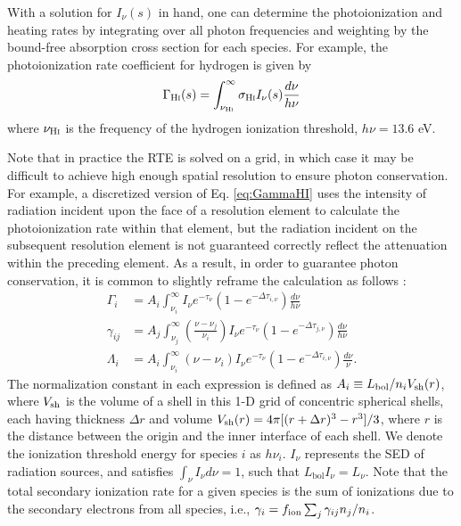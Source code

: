 With a solution for $I_{\nu}(s)$ in hand, one can determine the photoionization and heating rates by integrating over all photon frequencies and weighting by the bound-free absorption cross section for each species. For example, the photoionization rate coefficient for hydrogen is given by
\begin{equation}
	\Gamma_{\text{H} {\textsc{i}}}(s) = \int_{\nu_{\text{H} {\textsc{i}}}}^{\infty} \sigma_{\text{H} {\textsc{i}}} I_{\nu}(s) \frac{d\nu}{h\nu} \label{eq:GammaHI}
\end{equation}
where $\nu_{\text{H} {\textsc{i}}}$ is the frequency of the hydrogen ionization threshold, $h\nu=13.6$ eV.

Note that in practice the RTE is solved on a grid, in which case it may be difficult to achieve high enough spatial resolution to ensure photon conservation. For example, a discretized version of Eq. \ref{eq:GammaHI} uses the intensity of radiation incident upon the face of a resolution element to calculate the photoionization rate within that element, but the radiation incident on the subsequent resolution element is not guaranteed correctly reflect the attenuation within the preceding element. As a result, in order to guarantee photon conservation, it is common to slightly reframe the calculation as follows \cite{Abel1999}:
\begin{align}
    \Gamma_i & = A_i \int_{\nu_i}^{\infty} I_{\nu} e^{-\tau_{\nu}} \left(1 - e^{-\Delta \tau_{i,\nu}}\right) \frac{d\nu}{h\nu} \label{eq:PhotoIonizationRate} \\
    \gamma_{ij} & = A_j \int_{\nu_j}^{\infty} \left(\frac{\nu - \nu_j}{\nu_i}\right) I_{\nu} e^{-\tau_{\nu}} \left(1 - e^{-\Delta \tau_{j,\nu}}\right) \frac{d\nu}{h\nu} \label{eq:SecondaryIonizationRate} \\
    \Lambda_i & = A_i \int_{\nu_i}^{\infty} (\nu - \nu_i) I_{\nu} e^{-\tau_{\nu}} \left(1 - e^{-\Delta \tau_{i,\nu}}\right) \frac{d\nu}{\nu}  \label{eq:HeatingRate} .
\end{align}
The normalization constant in each expression is defined as $A_i \equiv L_{\mathrm{bol}}/n_i V_{\mathrm{sh}}(r)$, where $V_{\mathrm{sh}}$ is the volume of a shell in this 1-D grid of concentric spherical shells, each having thickness $\Delta r$ and volume $V_{\mathrm{sh}}(r) = 4 \pi [(r + \Delta r)^3 - r^3] / 3$, where $r$ is the distance between the origin and the inner interface of each shell. We denote the ionization threshold energy for species $i$ as $h\nu_i$. $I_{\nu}$ represents the SED of radiation sources, and satisfies $\int_{\nu} I_{\nu} d\nu = 1$, such that $L_{\mathrm{bol}} I_{\nu} = L_{\nu}$. Note that the total secondary ionization rate for a given species is the sum of ionizations due to the secondary electrons from all species, i.e., $\gamma_i = f_{\text{ion}} \sum_j \gamma_{ij} n_j / n_i$.

